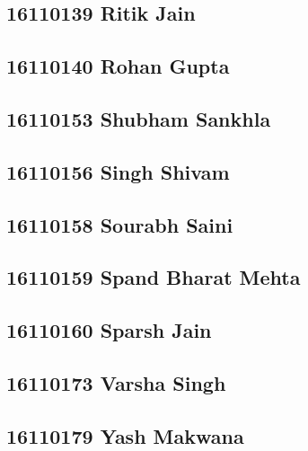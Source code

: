 \documentclass[journal=jpcbfk,manuscript=article]{achemso}
\begin{document}
\subsection {16110139	Ritik Jain}

\subsection {16110140	Rohan Gupta}

\subsection {16110153	Shubham Sankhla}

\subsection {16110156	Singh Shivam}

\subsection {16110158	Sourabh Saini}

\subsection {16110159	Spand Bharat Mehta}

\subsection {16110160	Sparsh Jain}

\subsection {16110173	Varsha Singh}

\subsection {16110179	Yash Makwana}


%
%
\end{document}
